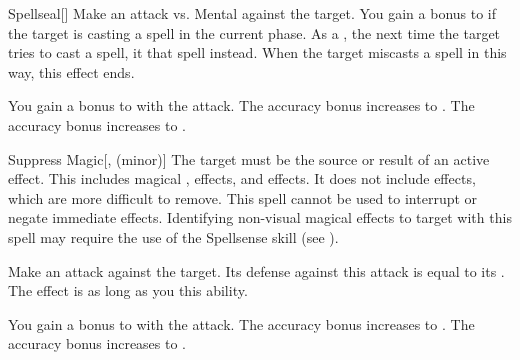 \lowercase{\hypertarget{spell:Spellseal}{}}\label{spell:Spellseal}
\begin{freeability}[Rank 2]{\hypertarget{spell:Spellseal}{Spellseal}}[]
Make an attack vs. Mental against the target.
You gain a  bonus to  if the target is casting a spell in the current phase.
\hit As a , the next time the target tries to cast a spell, it  that spell instead.
When the target miscasts a spell in this way, this effect ends.

\rankline
{} You gain a  bonus to  with the attack.
 The accuracy bonus increases to .
 The accuracy bonus increases to .

\end{freeability}
\vspace{0.25em}



\lowercase{\hypertarget{spell:Suppress Magic}{}}\label{spell:Suppress Magic}
\begin{freeability}[Rank 2]{\hypertarget{spell:Suppress Magic}{Suppress Magic}}[,  (minor)]
The target must be the source or result of an active  effect.
This includes magical ,  effects, and  effects.
It does not include  effects, which are more difficult to remove.
This spell cannot be used to interrupt or negate immediate effects.
Identifying non-visual magical effects to target with this spell may require the use of the Spellsense skill (see ).

Make an attack against the target.
Its defense against this attack is equal to its .
\hit The effect is  as long as you  this ability.

\rankline
{} You gain a  bonus to  with the attack.
 The accuracy bonus increases to .
 The accuracy bonus increases to .

\end{freeability}
\vspace{0.25em}



